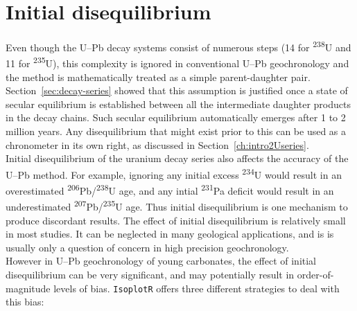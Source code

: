 \begin{refsection}
\begin{enumerate}
\begin{enumerate}
  \end{enumerate}
\end{enumerate}

\section{Initial disequilibrium}
\label{sec:U-Pb-disequilibrium}

Even though the U--Pb decay systems consist of numerous steps (14 for
\textsuperscript{238}U and 11 for \textsuperscript{235}U), this
complexity is ignored in conventional U--Pb geochronology and the
method is mathematically treated as a simple parent-daughter pair.
Section~\ref{sec:decay-series} showed that this assumption is
justified once a state of secular equilibrium is established between
all the intermediate daughter products in the decay chains.  Such
secular equilibrium automatically emerges after 1 to 2 million years.
Any disequilibrium that might exist prior to this can be used as a
chronometer in its own right, as discussed in
Section~\ref{ch:intro2Useries}.\\

Initial disequilibrium of the uranium decay series also affects the
accuracy of the U--Pb method. For example, ignoring any initial excess
\textsuperscript{234}U would result in an overestimated
\textsuperscript{206}Pb/\textsuperscript{238}U age, and any intial
\textsuperscript{231}Pa deficit would result in an underestimated
\textsuperscript{207}Pb/\textsuperscript{235}U age. Thus initial
disequilibrium is one mechanism to produce discordant results. The
effect of initial disequilibrium is relatively small in most
studies. It can be neglected in many geological applications, and is
is usually only a question of concern in high precision
geochronology.\\

However in U--Pb geochronology of young carbonates, the effect of
initial disequilibrium can be very significant, and may potentially
result in order-of-magnitude levels of bias. \texttt{IsoplotR} offers
three different strategies to deal with this bias:


\end{refsection}
